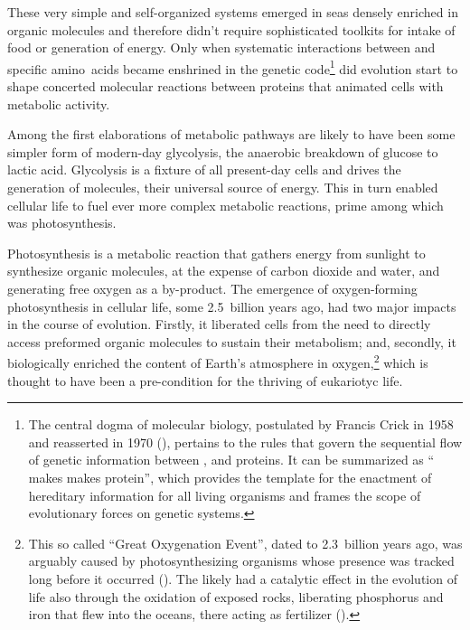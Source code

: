 \documentclass{tufte-book}
\begin{document}
These very simple and \mbox{self-organized} systems emerged in seas densely
enriched in organic molecules and therefore didn't require sophisticated
toolkits for intake of food or generation of energy.  Only when systematic
interactions between  and specific amino~acids became enshrined
in the genetic code\footnote{The central dogma of molecular biology, postulated
  by Francis Crick in 1958 and reasserted in 1970
  (\citealp{crick_protein_1958,crick_central_1970}), pertains to the rules that
  govern the sequential flow of genetic information between ,
   and proteins. It can be summarized as `` makes
   makes protein'', which provides the template for the enactment
  of hereditary information for all living organisms and frames the scope of
  evolutionary forces on genetic systems.} did evolution start to shape
concerted molecular reactions between proteins that animated cells with
metabolic activity.

Among the first elaborations of metabolic pathways are likely to have been some
simpler form of \mbox{modern-day} glycolysis, the anaerobic breakdown of glucose
to lactic acid.  Glycolysis is a fixture of all \mbox{present-day} cells and
drives the generation of  molecules, their universal source of
energy.  This in turn enabled cellular life to fuel ever more complex metabolic
reactions, prime among which was photosynthesis.

Photosynthesis is a metabolic reaction that gathers energy from sunlight to
synthesize organic molecules, at the expense of carbon dioxide and water, and
generating free oxygen as a \mbox{by-product}.  The emergence of
\mbox{oxygen-forming} photosynthesis in cellular life, some 2.5~billion years
ago, had two major impacts in the course of evolution.  Firstly, it liberated
cells from the need to directly access preformed organic molecules to sustain
their metabolism; and, secondly, it biologically enriched the content of Earth's
atmosphere in oxygen,\footnote{This so called ``Great Oxygenation Event'', dated
  to 2.3~billion years ago, was arguably caused by photosynthesizing organisms
  whose presence was tracked long before it occurred
  (\citealp{flannery_archean_2012}). The  likely had a catalytic
  effect in the evolution of life also through the oxidation of exposed rocks,
  liberating phosphorus and iron that flew into the oceans, there acting as
  fertilizer (\citealp{zimmer_mystery_2013}).} which is thought to have been a
\mbox{pre-condition} for the thriving of eukariotyc life.
\end{document}
